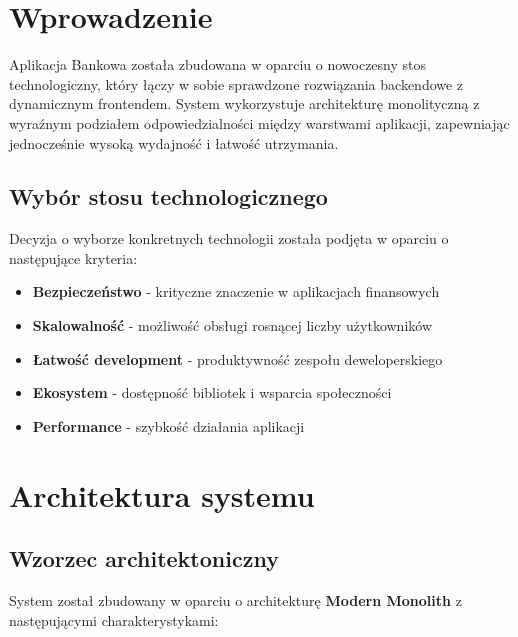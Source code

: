     \maketitle
    \thispagestyle{empty}

    \newpage
    \tableofcontents
    \newpage

    \section{Wprowadzenie}

    Aplikacja Bankowa została zbudowana w oparciu o nowoczesny stos technologiczny, który łączy w sobie sprawdzone rozwiązania backendowe z dynamicznym frontendem. System wykorzystuje architekturę monolityczną z wyraźnym podziałem odpowiedzialności między warstwami aplikacji, zapewniając jednocześnie wysoką wydajność i łatwość utrzymania.

    \subsection{Wybór stosu technologicznego}

    Decyzja o wyborze konkretnych technologii została podjęta w oparciu o następujące kryteria:
    \begin{itemize}
        \item \textbf{Bezpieczeństwo} - krityczne znaczenie w aplikacjach finansowych
        \item \textbf{Skalowalność} - możliwość obsługi rosnącej liczby użytkowników
        \item \textbf{Łatwość development} - produktywność zespołu deweloperskiego
        \item \textbf{Ekosystem} - dostępność bibliotek i wsparcia społeczności
        \item \textbf{Performance} - szybkość działania aplikacji
    \end{itemize}

    \section{Architektura systemu}

    \subsection{Wzorzec architektoniczny}

    System został zbudowany w oparciu o architekturę \textbf{Modern Monolith} z następującymi charakterystykami:


